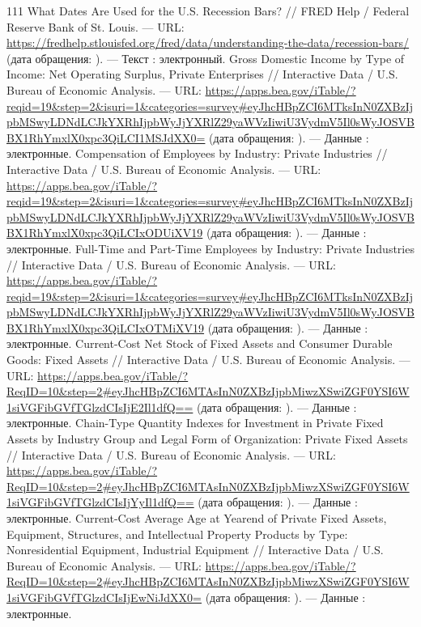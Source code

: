 \begin{RaggedRight}
\begin{thebibliography}{111}
     \hypertarget{bib:NBER}{} What Dates Are Used for the U.S. Recession Bars? // FRED Help / Federal Reserve Bank of St. Louis. --- URL: \url{https://fredhelp.stlouisfed.org/fred/data/understanding-the-data/recession-bars/} (дата обращения: \bibaccessdate). --- Текст : электронный.
     \hypertarget{bib:BEA-1.10}{} Gross Domestic Income by Type of Income: Net Operating Surplus, Private Enterprises // Interactive Data / U.S. Bureau of Economic Analysis. --- URL: \url{https://apps.bea.gov/iTable/?reqid=19&step=2&isuri=1&categories=survey#eyJhcHBpZCI6MTksInN0ZXBzIjpbMSwyLDNdLCJkYXRhIjpbWyJjYXRlZ29yaWVzIiwiU3VydmV5Il0sWyJOSVBBX1RhYmxlX0xpc3QiLCI1MSJdXX0=} (дата обращения: \bibaccessdate). --- Данные : электронные.
     \hypertarget{bib:BEA-6.2}{} Compensation of Employees by Industry: Private Industries // Interactive Data / U.S. Bureau of Economic Analysis. --- URL: \url{https://apps.bea.gov/iTable/?reqid=19&step=2&isuri=1&categories=survey#eyJhcHBpZCI6MTksInN0ZXBzIjpbMSwyLDNdLCJkYXRhIjpbWyJjYXRlZ29yaWVzIiwiU3VydmV5Il0sWyJOSVBBX1RhYmxlX0xpc3QiLCIxODUiXV19} (дата обращения: \bibaccessdate). --- Данные : электронные.
     \hypertarget{bib:BEA-6.4}{} Full-Time and Part-Time Employees by Industry: Private Industries // Interactive Data / U.S. Bureau of Economic Analysis. --- URL: \url{https://apps.bea.gov/iTable/?reqid=19&step=2&isuri=1&categories=survey#eyJhcHBpZCI6MTksInN0ZXBzIjpbMSwyLDNdLCJkYXRhIjpbWyJjYXRlZ29yaWVzIiwiU3VydmV5Il0sWyJOSVBBX1RhYmxlX0xpc3QiLCIxOTMiXV19} (дата обращения: \bibaccessdate). --- Данные : электронные.
     \hypertarget{bib:BEA-1.1}{} Current-Cost Net Stock of Fixed Assets and Consumer Durable Goods: Fixed Assets // Interactive Data / U.S. Bureau of Economic Analysis. --- URL: \url{https://apps.bea.gov/iTable/?ReqID=10&step=2#eyJhcHBpZCI6MTAsInN0ZXBzIjpbMiwzXSwiZGF0YSI6W1siVGFibGVfTGlzdCIsIjE2Il1dfQ==} (дата обращения: \bibaccessdate). --- Данные : электронные.
     \hypertarget{bib:BEA-6.8}{} Chain-Type Quantity Indexes for Investment in Private Fixed Assets by Industry Group and Legal Form of Organization: Private Fixed Assets // Interactive Data / U.S. Bureau of Economic Analysis. --- URL: \url{https://apps.bea.gov/iTable/?ReqID=10&step=2#eyJhcHBpZCI6MTAsInN0ZXBzIjpbMiwzXSwiZGF0YSI6W1siVGFibGVfTGlzdCIsIjYyIl1dfQ==} (дата обращения: \bibaccessdate). --- Данные : электронные.
     \hypertarget{bib:BEA-2.9}{} Current-Cost Average Age at Yearend of Private Fixed Assets, Equipment, Structures, and Intellectual Property Products by Type: Nonresidential Equipment, Industrial Equipment // Interactive Data / U.S. Bureau of Economic Analysis. --- URL: \url{https://apps.bea.gov/iTable/?ReqID=10&step=2#eyJhcHBpZCI6MTAsInN0ZXBzIjpbMiwzXSwiZGF0YSI6W1siVGFibGVfTGlzdCIsIjEwNiJdXX0=} (дата обращения: \bibaccessdate). --- Данные : электронные.

\end{thebibliography}
\end{RaggedRight}
